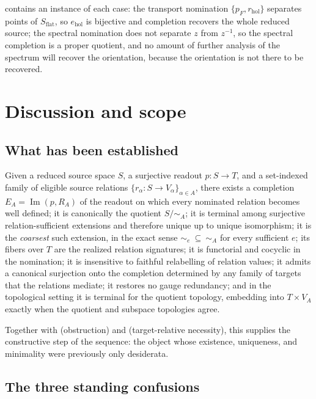 \documentclass[11pt,reqno]{amsart}
\theoremstyle{plain}
\theoremstyle{definition}
\theoremstyle{remark}
\numberwithin{equation}{section}
\DeclareMathOperator{\Image}{Im}
\begin{document}
 contains an instance of each case: the transport nomination $\{p_F,r_{\mathrm{hol}}\}$
separates points of $S_{\mathrm{flat}}$, so $e_{\mathrm{hol}}$ is bijective and completion recovers
the whole reduced source; the spectral nomination does not separate $z$ from $z^{-1}$, so the
spectral completion is a proper quotient, and no amount of further analysis of the spectrum will
recover the orientation, because the orientation is not there to be recovered.

\section{Discussion and scope}
\label{sec:discussion}

\subsection{What has been established}

Given a reduced source space $S$, a surjective readout $p\colon S\to T$, and a set-indexed family of
eligible source relations $\{r_\alpha\colon S\to V_\alpha\}_{\alpha\in A}$, there exists a completion
$E_A=\Image(p,R_A)$ of the readout on which every nominated relation becomes well defined; it is
canonically the quotient $S/\!\sim_A$; it is terminal among surjective relation-sufficient extensions
and therefore unique up to unique isomorphism; it is the \emph{coarsest} such extension, in the exact
sense $\sim_e\ \subseteq\ \sim_A$ for every sufficient $e$; its fibers over $T$ are the realized
relation signatures; it is functorial and cocyclic in the nomination; it is insensitive to faithful
relabelling of relation values; it admits a canonical surjection onto the completion determined by
any family of targets that the relations mediate; it restores no gauge redundancy; and in the
topological setting it is terminal for the quotient topology, embedding into $T\times V_A$ exactly
when the quotient and subspace topologies agree.

Together with \cite{Paper1} (obstruction) and \cite{Paper2} (target-relative necessity), this
supplies the constructive step of the sequence: the object whose existence, uniqueness, and
minimality were previously only desiderata.

\subsection{The three standing confusions}
\end{document}
